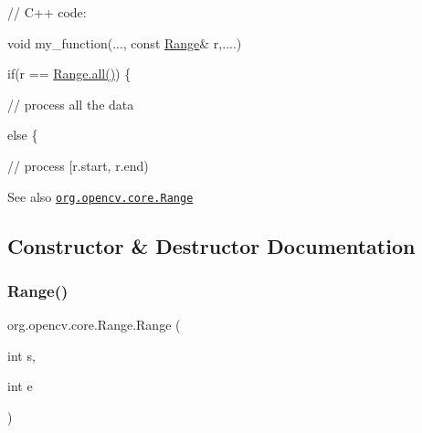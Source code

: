 {\ttfamily }

{\ttfamily }

{\ttfamily // C++ code\+:}

{\ttfamily }

{\ttfamily }

{\ttfamily void my\+\_\+function(..., const \mbox{\hyperlink{classorg_1_1opencv_1_1core_1_1_range}{Range}}\& r,....)}

{\ttfamily }

{\ttfamily }

{\ttfamily if(r == \mbox{\hyperlink{classorg_1_1opencv_1_1core_1_1_range_a2dd4a07a9715665aacee5c7cdf79a175}{Range.\+all()}}) \{}

{\ttfamily }

{\ttfamily }

{\ttfamily // process all the data}

{\ttfamily }

{\ttfamily }

{\ttfamily else \{}

{\ttfamily }

{\ttfamily }

{\ttfamily // process \mbox{[}r.\+start, r.\+end)}

{\ttfamily }

{\ttfamily }

{\ttfamily }

\begin{DoxySeeAlso}{See also}
\href{http://docs.opencv.org/modules/core/doc/basic_structures.html#range}{\tt org.\+opencv.\+core.\+Range} 
\end{DoxySeeAlso}


\subsection{Constructor \& Destructor Documentation}
\mbox{\label{classorg_1_1opencv_1_1core_1_1_range_a1089f14e7fa40016a6cbd17991c2dae4}} 
\subsubsection{\texorpdfstring{Range()}{Range()}\hspace{0.1cm}{\footnotesize\ttfamily [1/3]}}
{\footnotesize\ttfamily org.\+opencv.\+core.\+Range.\+Range (\begin{DoxyParamCaption}\item[{int}]{s,  }\item[{int}]{e }\end{DoxyParamCaption})}

